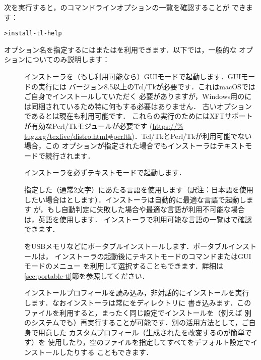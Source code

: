 \documentclass[uplatex,dvipdfmx,tombow]{jsarticle}
\begin{document}
次を実行すると，のコマンドラインオプションの一覧を確認することが
できます：
%
\begin{alltt}
> install-tl -help
\end{alltt}
%
オプション名を指定するには\sopt{}または\lopt{}を利用できます．以下では，一般的な
オプションについてのみ説明します：
%
\begin{description}
\item[]
インストーラを（もし利用可能なら）GUIモードで起動します．GUIモードの実行には
バージョン8.5以上のTcl/Tkが必要です．これはmacOSではご自身でインストールしていただく
必要がありますが，Windows用の\TL には同梱されているため特に何もする必要はありません．
古いオプションであるとは現在も利用可能です．
これらの実行のためにはXFTサポートが有効なPerl/Tkモジュールが必要です (\url{https://%
tug.org/texlive/distro.html#perltk})．Tcl/TkとPerl/Tkが利用可能でない場合，この
オプションが指定された場合でもインストーラはテキストモードで続行されます．

\item[]
インストーラを必ずテキストモードで起動します．

\item[]
指定した（通常2文字）にあたる言語を使用します（訳注：日本語を使用
したい場合はとします）．インストーラは自動的に最適な言語で起動します
が，もし自動判定に失敗した場合や最適な言語が利用不可能な場合は，英語を使用します．
インストーラで利用可能な言語の一覧はで確認できます．

\item[]
\TL をUSBメモリなどにポータブルインストールします．ポータブルインストールは，
インストーラの起動後にテキストモードのコマンドまたはGUIモードのメニュー
を利用して選択することもできます．詳細は\ref{sec:portable-tl}節を参照してください．

\item[]
インストールプロフィールを読み込み，非対話的にインストールを実行
します．なおインストーラは常にをディレクトリに
書き込みます．このファイルを利用すると，まったく同じ設定でインストールを（例えば
別のシステムでも）再実行することが可能です．別の活用方法として，ご自身で用意した
カスタムプロフィール（生成されたを改変するのが簡単です）を
使用したり，空のファイルを指定してすべてをデフォルト設定でインストールしたりする
こともできます．


\end{description}
\end{document}
